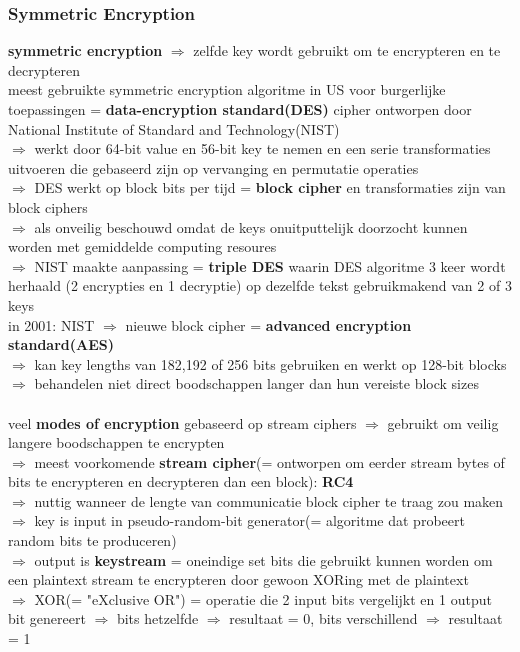 \documentclass{report}
\begin{document}
\subsubsection{Symmetric Encryption}
\textbf{symmetric encryption} $\Rightarrow$ zelfde key wordt gebruikt om te encrypteren en te decrypteren
\\meest gebruikte symmetric encryption algoritme in US voor burgerlijke toepassingen = \textbf{data-encryption standard(DES)} cipher ontworpen door National Institute of Standard and Technology(NIST)
\\$\Rightarrow$ werkt door 64-bit value en 56-bit key te nemen en een serie transformaties uitvoeren die gebaseerd zijn op vervanging en permutatie operaties 
\\$\Rightarrow$ DES werkt op block bits per tijd = \textbf{block cipher} en transformaties zijn van block ciphers
\\$\Rightarrow$ als onveilig beschouwd omdat de keys onuitputtelijk doorzocht kunnen worden met gemiddelde computing resoures
\\$\Rightarrow$ NIST maakte aanpassing = \textbf{triple DES} waarin DES algoritme 3 keer wordt herhaald (2 encrypties en 1 decryptie) op dezelfde tekst gebruikmakend van 2 of 3 keys
\\in 2001: NIST $\Rightarrow$ nieuwe block cipher = \textbf{advanced encryption standard(AES)} 
\\$\Rightarrow$ kan key lengths van 182,192 of 256 bits gebruiken en werkt op 128-bit blocks
\\$\Rightarrow$ behandelen niet direct boodschappen langer dan hun vereiste block sizes
\\
\\veel \textbf{modes of encryption} gebaseerd op stream ciphers $\Rightarrow$ gebruikt om veilig langere boodschappen te encrypten
\\$\Rightarrow$ meest voorkomende \textbf{stream cipher}(= ontworpen om eerder stream bytes of bits te encrypteren en decrypteren dan een block): \textbf{RC4} 
\\$\Rightarrow$ nuttig wanneer de lengte van communicatie block cipher te traag zou maken
\\$\Rightarrow$ key is input in pseudo-random-bit generator(= algoritme dat probeert random bits te produceren)
\\$\Rightarrow$ output is \textbf{keystream} = oneindige set bits die gebruikt kunnen worden om een plaintext stream te encrypteren door gewoon XORing met de plaintext
\\$\Rightarrow$ XOR(= "eXclusive OR") = operatie die 2 input bits vergelijkt en 1 output bit genereert $\Rightarrow$ bits hetzelfde $\Rightarrow$ resultaat = 0, bits verschillend $\Rightarrow$ resultaat = 1
\end{document}
